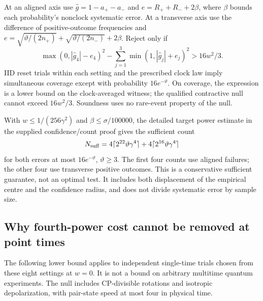 At an aligned axis use $\widehat g=1-a_+-a_-$ and
$e=R_++R_-+2\beta$, where $\beta$ bounds each probability's nonclock
systematic error. At a transverse axis use the difference of positive-outcome
frequencies and $e=\sqrt{\vartheta/(2n_+)}+
\sqrt{\vartheta/(2n_-)}+2\beta$. Reject only if
\begin{equation}\label{eq:count-rule}
 \max(0,|\widehat g_4|-e_4)^2
 -\sum_{j=1}^3\min(1,|\widehat g_j|+e_j)^2>16w^2/3.
\end{equation}
IID reset trials within each setting and the prescribed clock law imply
simultaneous coverage except with probability $16e^{-\vartheta}$.
On coverage, the expression is a lower bound on the clock-averaged witness;
the qualified contractive null cannot exceed $16w^2/3$.
Soundness uses no rare-event property of the null.

With $w\leq1/(256\gamma^2)$ and $\beta\leq\sigma/100000$, the detailed
target power estimate in the supplied confidence/count proof gives the sufficient count
\begin{equation}\label{eq:sufficient-count}
 N_{\rm suff}=4\lceil2^{22}\vartheta\gamma^4\rceil
             +4\lceil2^{16}\vartheta\gamma^4\rceil
\end{equation}
for both errors at most $16e^{-\vartheta}$, $\vartheta\geq3$.
The first four counts use aligned failures; the other four use transverse
positive outcomes. This is a conservative sufficient guarantee, not an
optimal test. It includes both displacement of the empirical centre and
the confidence radius, and does not divide systematic error by sample size.

\subsection{Why fourth-power cost cannot be removed at point times}
The following lower bound applies to independent single-time trials chosen
from these eight settings at $w=0$. It is not a bound on arbitrary multitime
quantum experiments. The null includes CP-divisible rotations and isotropic
depolarization, with pair-state speed at most four in physical time.

